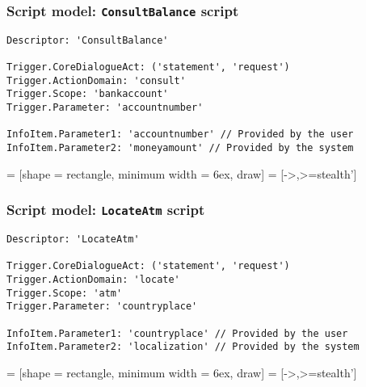 \documentclass[11pt]{beamer}
\begin{document}
\begin{frame}[fragile]
\frametitle{Script model: \texttt{ConsultBalance} script}
\scriptsize
\begin{lstlisting}[language=lekta]
Descriptor: 'ConsultBalance'

Trigger.CoreDialogueAct: ('statement', 'request')
Trigger.ActionDomain: 'consult' 
Trigger.Scope: 'bankaccount'
Trigger.Parameter: 'accountnumber'			
			
InfoItem.Parameter1: 'accountnumber' // Provided by the user
InfoItem.Parameter2: 'moneyamount' // Provided by the system
\end{lstlisting}

 = [shape            = rectangle,
                           minimum width    = 6ex,%
                           draw]
   = [->,>=stealth']      
\begin{center}
\end{center}
\end{frame}

\begin{frame}[fragile]
\frametitle{Script model: \texttt{LocateAtm} script}
\scriptsize
\begin{lstlisting}[language=lekta]
Descriptor: 'LocateAtm'

Trigger.CoreDialogueAct: ('statement', 'request')
Trigger.ActionDomain: 'locate' 
Trigger.Scope: 'atm'
Trigger.Parameter: 'countryplace'			
			
InfoItem.Parameter1: 'countryplace' // Provided by the user
InfoItem.Parameter2: 'localization' // Provided by the system
\end{lstlisting}

 = [shape            = rectangle,
                           minimum width    = 6ex,%
                           draw]
   = [->,>=stealth']      
\begin{center}
\end{center}
\end{frame}
\end{document}
